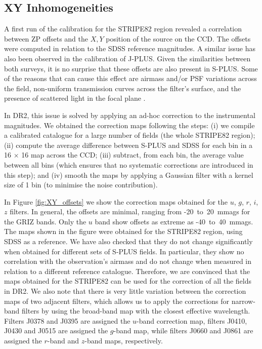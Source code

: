 \documentclass[fleqn,usenatbib]{mnras}
\begin{document}
\subsection{XY Inhomogeneities}
\label{sec:CCD_correction}
A first run of the calibration for the STRIPE82 region revealed a correlation between ZP offsets and the $X,Y$ position of the source on the CCD. The offsets were computed in relation to the SDSS reference magnitudes. A similar issue has also been observed in the calibration of J-PLUS. Given the similarities between both surveys, it is no surprise that these offsets are also present in S-PLUS. Some of the reasons that can cause this effect are airmass and/or PSF variations across the field, non-uniform transmission curves across the filter's surface, and the presence of scattered light in the focal plane \citep{Regnault+2009, Starkenburg+2017, LopesSanjuan+2019}.

In DR2, this issue is solved by applying an ad-hoc correction to the instrumental magnitudes. We obtained the correction maps following the steps: (i) we compile a calibrated catalogue for a large number of fields (the whole STRIPE82 region); (ii) compute the average difference between S-PLUS and SDSS for each bin in a 16 $\times$ 16 map across the CCD; (iii) subtract, from each bin, the average value between all bins (which ensures that no systematic corrections are introduced in this step); and (iv) smooth the maps by applying a Gaussian filter with a kernel size of 1 bin (to minimise the noise contribution).

In Figure \ref{fig:XY_offsets} we show the correction maps obtained for the $u$, $g$, $r$, $i$, $z$ filters. In general, the offsets are minimal, ranging from -20~to~20~mmags for the GRIZ bands. Only the $u$ band show offsets as extreme as -40~to~40~mmags. The maps shown in the figure were obtained for the STRIPE82 region, using SDSS as a reference. We have also checked that they do not change significantly when obtained for different sets of S-PLUS fields. In particular, they show no correlation with the observation's airmass and do not change when measured in relation to a different reference catalogue. Therefore, we are convinced that the maps obtained for the STRIPE82 can be used for the correction of all the fields in DR2. We also note that there is very little variation between the correction maps of two adjacent filters, which allows us to apply the corrections for narrow-band filters by using the broad-band map with the closest effective wavelength. Filters J0378 and J0395 are assigned the $u$-band correction map, filters J0410, J0430 and J0515 are assigned the $g$-band map, while filters J0660 and J0861 are assigned the $r$-band and $z$-band maps, respectively.
\end{document}
